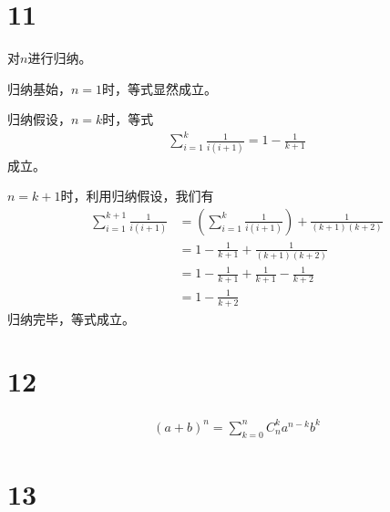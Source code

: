 \documentclass{article}
\begin{document}
\section*{11}

对$n$进行归纳。

归纳基始，$n = 1$时，等式显然成立。

归纳假设，$n = k$时，等式
\begin{align*}
      \sum\limits_{i = 1}^{k} \frac{1}{i(i + 1)} = 1 - \frac{1}{k + 1}
\end{align*}
成立。

$n = k + 1$时，利用归纳假设，我们有
\begin{align*}
      \sum\limits_{i = 1}^{k + 1} \frac{1}{i(i + 1)}
       & = \left(\sum\limits_{i = 1}^{k} \frac{1}{i(i + 1)}\right) + \frac{1}{(k + 1)(k + 2)} \\
       & = 1 - \frac{1}{k + 1} + \frac{1}{(k + 1)(k + 2)}                                     \\
       & = 1 - \frac{1}{k + 1} + \frac{1}{k + 1} - \frac{1}{k + 2}                            \\
       & = 1 - \frac{1}{k + 2}
\end{align*}
归纳完毕，等式成立。

\section*{12}

\begin{align*}
      (a + b)^n = \sum\limits_{k = 0}^{n} C_n^k a^{n-k}b^k
\end{align*}

\section*{13}
\end{document}
